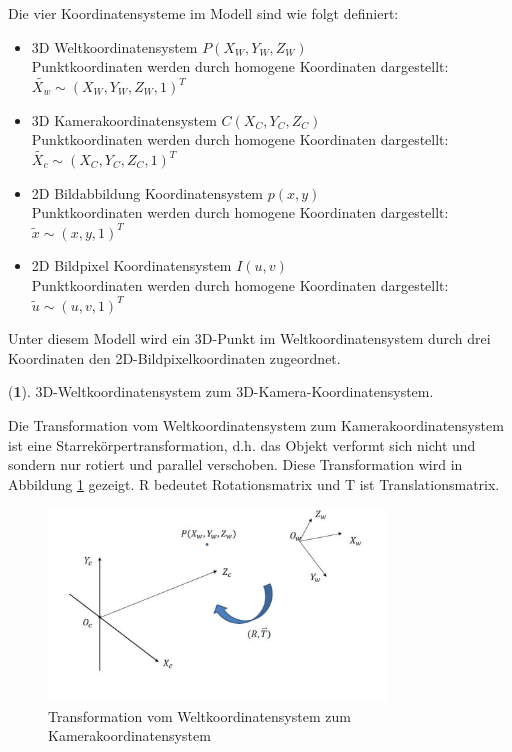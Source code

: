 Die vier Koordinatensysteme im Modell sind wie folgt definiert:

\begin{itemize}
	\item 3D Weltkoordinatensystem $P(X_W,Y_W,Z_W)$ \\
	Punktkoordinaten werden durch homogene Koordinaten dargestellt: $\widetilde{X_w}\sim(X_W,Y_W,Z_W,1)^T$
	\item 3D Kamerakoordinatensystem $C(X_C,Y_C,Z_C)$\\
	Punktkoordinaten werden durch homogene Koordinaten dargestellt: $\widetilde{X_c}\sim(X_C,Y_C,Z_C,1)^T$
	\item 2D Bildabbildung Koordinatensystem $p(x,y)$\\
	Punktkoordinaten werden durch homogene Koordinaten dargestellt: $\widetilde{x}\sim(x,y,1)^T$
	\item 2D Bildpixel Koordinatensystem $I(u,v)$\\
	Punktkoordinaten werden durch homogene Koordinaten dargestellt: $\widetilde{u}\sim(u,v,1)^T$
\end{itemize}

Unter diesem Modell wird ein 3D-Punkt im Weltkoordinatensystem durch drei Koordinaten den 2D-Bildpixelkoordinaten zugeordnet.

(\textbf{1}). 3D-Weltkoordinatensystem zum 3D-Kamera-Koordinatensystem.

Die Transformation vom Weltkoordinatensystem zum Kamerakoordinatensystem ist eine Starrekörpertransformation, d.h. das Objekt verformt sich nicht und sondern nur rotiert und parallel verschoben. Diese Transformation wird in Abbildung \ref{fig:WzuC} gezeigt. R bedeutet Rotationsmatrix und T ist Translationsmatrix.

\begin{figure}[htb]
 \centering 
 \includegraphics[keepaspectratio,width=0.8\textwidth]{images/3_Ersteverfahren/Kamera/WzuC.pdf}
 \caption{Transformation vom Weltkoordinatensystem zum Kamerakoordinatensystem}
 \label{fig:WzuC}
\end{figure} 

